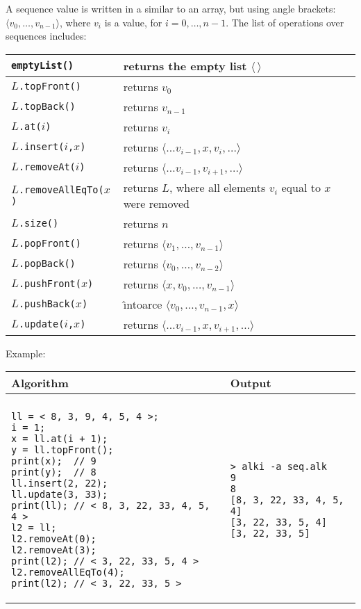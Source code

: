 \documentclass[a4paper]{report}
\begin{document}
A sequence value is written in a similar to an array, but using angle brackets: $\langle v_0,\ldots,v_{n-1}\rangle$, where $v_i$ is a value, for $i=0,\ldots,n-1$. 
The list of operations over sequences includes:
\begin{center}
\begin{tabular}{|l|l|}
\hline
\texttt{emptyList()}
&
returns the empty list $\langle\,\rangle$\\
\hline
$L$\texttt{.topFront()}
&
returns $v_0$\\
\hline
$L$\texttt{.topBack()}
&
returns $v_{n-1}$\\
\hline
$L$\texttt{.at($i$)}
&
returns $v_i$\\
\hline
$L$\texttt{.insert($i$,$x$)}
&
returns $\langle\ldots v_{i-1},x,v_i,\ldots\rangle$\\
\hline
$L$\texttt{.removeAt($i$)}
&
returns $\langle\ldots v_{i-1},v_{i+1},\ldots\rangle$\\
\hline
$L$\texttt{.removeAllEqTo($x$)}
&
returns $L$, where all elements $v_i$ equal to $x$ were removed\\
\hline
$L$\texttt{.size()}
&
returns $n$\\
\hline
 $L$\texttt{.popFront()}
&
returns $\langle v_1,\ldots,v_{n-1}\rangle$\\
\hline
$L$\texttt{.popBack()}
&
returns $\langle v_0,\ldots,v_{n-2}\rangle$\\
\hline
$L$\texttt{.pushFront($x$)}
&
returns $\langle x,v_0,\ldots,v_{n-1}\rangle$\\
\hline
$L$\texttt{.pushBack($x$)}
&
\^{\i}ntoarce $\langle v_0,\ldots,v_{n-1},x\rangle$\\
\hline
$L$\texttt{.update($i$,$x$)}
&
returns $\langle\ldots v_{i-1},x,v_{i+1},\ldots\rangle$\\
\hline
\end{tabular}
\end{center}
Example:
\begin{center}
\begin{tabular}{ll}
Algorithm & Output\\
\hline
\\
\begin{minipage}{.55\textwidth}
\begin{verbatim}
ll = < 8, 3, 9, 4, 5, 4 >;
i = 1;
x = ll.at(i + 1);
y = ll.topFront();
print(x);  // 9
print(y);  // 8
ll.insert(2, 22);
ll.update(3, 33);
print(ll); // < 8, 3, 22, 33, 4, 5, 4 >
l2 = ll;
l2.removeAt(0);
l2.removeAt(3);
print(l2); // < 3, 22, 33, 5, 4 >
l2.removeAllEqTo(4);
print(l2); // < 3, 22, 33, 5 >
\end{verbatim}
\end{minipage}
&
\begin{minipage}{.45\textwidth}
\begin{verbatim}
> alki -a seq.alk 
9
8
[8, 3, 22, 33, 4, 5, 4]
[3, 22, 33, 5, 4]
[3, 22, 33, 5]
\end{verbatim}
\end{minipage}
\end{tabular}
\end{center}
\end{document}
